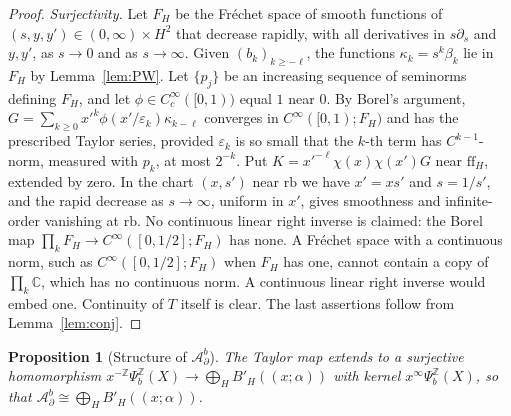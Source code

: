 \documentclass[11pt,oneside,reqno]{article}
\newcommand{\C}{\mathbb C}
\newcommand{\Z}{\mathbb Z}
\newcommand{\Adb}{\mathcal A^b_\partial}
\theoremstyle{plain}
\newtheorem{proposition}[theorem]{Proposition}
\theoremstyle{definition}
\theoremstyle{remark}
\newcommand{\Lser}[1]{(\!(#1)\!)}
\begin{document}
\begin{proof}
\emph{Surjectivity.} Let \(F_H\) be the Fréchet space of smooth functions of
\((s,y,y')\in(0,\infty)\times H^2\) that decrease rapidly, with all
derivatives in \(s\partial_s\) and \(y,y'\), as \(s\to0\) and as
\(s\to\infty\). Given \((b_k)_{k\geq-\ell}\), the functions
\(\kappa_k=s^k\beta_k\) lie in \(F_H\) by Lemma~\ref{lem:PW}. Let
\(\{p_j\}\) be an increasing sequence of seminorms defining \(F_H\), and let
\(\phi\in C_c^\infty([0,1))\) equal \(1\) near \(0\). By Borel's argument,
\(G=\sum_{k\geq0}x'^k\phi(x'/\varepsilon_k)\kappa_{k-\ell}\) converges in
\(C^\infty([0,1);F_H)\) and has the prescribed Taylor series, provided
\(\varepsilon_k\) is so small that the \(k\)-th term has \(C^{k-1}\)-norm,
measured with \(p_k\), at most \(2^{-k}\). Put
\(K=x'^{-\ell}\chi(x)\chi(x')G\) near \(\mathrm{ff}_H\), extended by zero.
In the chart \((x,s')\) near \(\mathrm{rb}\) we have \(x'=xs'\) and
\(s=1/s'\), and the rapid decrease as \(s\to\infty\), uniform in \(x'\),
gives smoothness and infinite-order vanishing at \(\mathrm{rb}\). No
continuous linear right inverse is claimed: the Borel map
\(\prod_kF_H\to C^\infty([0,1/2];F_H)\) has none. A Fréchet space
with a continuous norm, such as \(C^\infty([0,1/2];F_H)\) when \(F_H\) has
one, cannot contain a copy of \(\prod_k\C\), which has no continuous norm.
A continuous linear right inverse would embed one. Continuity of \(T\) itself is clear.
The last assertions follow from Lemma~\ref{lem:conj}.
\end{proof}

\begin{proposition}[Structure of \(\Adb\)]\label{prop:structureA}
The Taylor map extends to a surjective homomorphism
\(x^{-\Z}\Psi_b^{\Z}(X)\to\bigoplus_HB'_H\Lser{x;\alpha}\) with kernel
\(x^\infty\Psi_b^{\Z}(X)\), so that \(\Adb\cong\bigoplus_HB'_H\Lser{x;\alpha}\).
\end{proposition}
\end{document}
